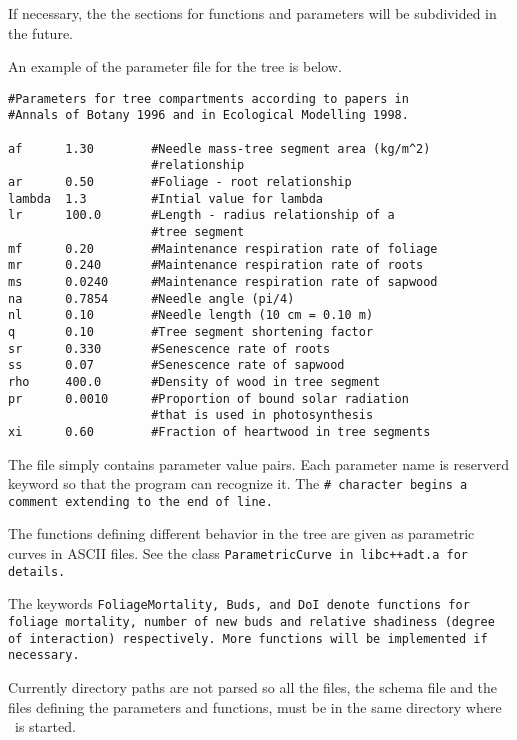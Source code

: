 If necessary, the the sections for functions and parameters
will be subdivided in the future. 

An example of the parameter file for the tree is below.

\begin{verbatim}
#Parameters for tree compartments according to papers in
#Annals of Botany 1996 and in Ecological Modelling 1998.

af      1.30        #Needle mass-tree segment area (kg/m^2)
                    #relationship
ar      0.50        #Foliage - root relationship 
lambda  1.3         #Intial value for lambda
lr      100.0       #Length - radius relationship of a 
                    #tree segment
mf      0.20        #Maintenance respiration rate of foliage
mr      0.240       #Maintenance respiration rate of roots
ms      0.0240      #Maintenance respiration rate of sapwood
na      0.7854      #Needle angle (pi/4)
nl      0.10        #Needle length (10 cm = 0.10 m) 
q       0.10        #Tree segment shortening factor
sr      0.330       #Senescence rate of roots
ss      0.07        #Senescence rate of sapwood
rho     400.0       #Density of wood in tree segment
pr      0.0010      #Proportion of bound solar radiation
                    #that is used in photosynthesis
xi      0.60        #Fraction of heartwood in tree segments
\end{verbatim}

The file simply contains parameter value pairs. Each parameter
name is reserverd keyword so that the program can recognize it.
The \tt \# \rm character begins a comment extending to the end of line.

The functions defining different behavior in the tree are given
as parametric curves in ASCII files. See the class 
\tt ParametricCurve \rm in \tt libc++adt.a \rm for details.

The keywords \tt FoliageMortality\rm, \tt Buds\rm, and
\tt DoI \rm denote functions for foliage mortality, number of new buds 
and relative shadiness (degree of interaction) respectively. More functions
will be implemented if necessary.

Currently directory paths are not parsed so all the files,
the schema file and the files defining the parameters and functions,
must be in the same directory where \lignum\ is started.
